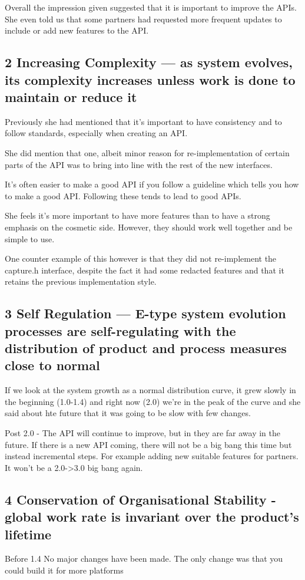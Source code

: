 \documentclass[conference]{IEEEtran}
\begin{document}
Overall the impression given suggested that it is important to improve the APIs. She even told us that some partners had requested more frequent updates to include or add new features to the API.

\subsection{2 Increasing Complexity — as system evolves, its complexity increases unless work is done to maintain or reduce it}


Previously she had mentioned that it’s important to have consistency and to follow standards, especially when creating an API. 

She did mention that one, albeit minor reason for re-implementation of certain parts of the API was to bring into line with the rest of the new interfaces. 

It’s often easier to make a good API if you follow a guideline which tells you how to make a good API. Following these tends to lead to good APIs.

She feels it’s more important to have more features than to have a strong emphasis on the cosmetic side. However, they should work well together and be simple to use. 

One counter example of this however is that they did not re-implement the capture.h interface, despite the fact it had some redacted features and that it retains the previous implementation style.

\subsection{3 Self Regulation — E-type system evolution processes are self-regulating with the distribution of product and process measures close to normal}
If we look at the system growth as a normal distribution curve, it grew slowly in the beginning (1.0-1.4) and right now (2.0) we're in the peak of the curve and she said about hte future that it was going to be slow with few changes. 

Post 2.0 - The API will continue to improve, but in they are far away in the future. If there is a new API coming, there will not be a big bang this time but instead incremental steps. For example adding new suitable features for partners. It won’t be a 2.0->3.0 big bang again. 

\subsection{4 Conservation of Organisational Stability - global work rate is invariant over the product's lifetime}
Before 1.4
No major changes have been made. 
The only change was that you could build it for more platforms
\end{document}
